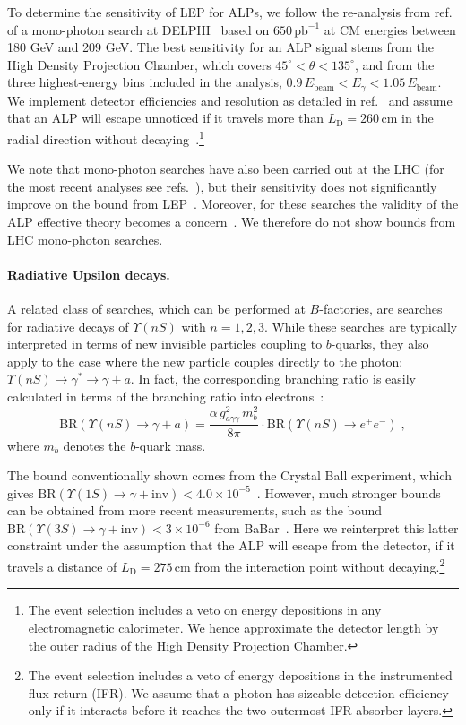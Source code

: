 \documentclass[11pt,a4paper]{article}
\newcommand{\ga}{g_{a\gamma\gamma}}
\def \babar {BaBar\xspace}
\begin{document}
To determine the sensitivity of LEP for ALPs, we follow the re-analysis from ref.~\cite{Fox:2011fx} of a mono-photon search at DELPHI~\cite{Abdallah:2008aa} based on $650\,\mathrm{pb^{-1}}$ at CM energies between 180 GeV and 209 GeV. The best sensitivity for an ALP signal stems from the High Density Projection Chamber, which covers $45^\circ < \theta < 135^\circ$, and from the three highest-energy bins included in the analysis, $0.9 \, E_\text{beam} < E_\gamma < 1.05 \, E_\text{beam}$. We implement detector efficiencies and resolution as detailed in ref.~\cite{Fox:2011fx} and assume that an ALP will escape unnoticed if it travels more than $L_\mathrm{D} = 260\,\mathrm{cm}$ in the radial direction without decaying~\cite{Aarnio:1990vx}.\footnote{The event selection includes a veto on energy depositions in any electromagnetic calorimeter. We hence approximate the detector length by the outer radius of the High Density Projection Chamber.}

We note that mono-photon searches have also been carried out at the LHC (for the most recent analyses see refs.~\cite{Aaboud:2017dor,CMS:2017ysu}), but their sensitivity does not significantly improve on the bound from LEP~\cite{Mimasu:2014nea}. Moreover, for these searches the validity of the ALP effective theory becomes a concern~\cite{Mimasu:2014nea,Brivio:2017ije}. We therefore do not show bounds from LHC mono-photon searches.

\paragraph{Radiative Upsilon decays.}
A related class of searches, which can be performed at $B$-factories, are searches for radiative decays of $\Upsilon(nS)$ with $n = 1,2,3$. While these searches are typically interpreted in terms of new invisible particles coupling to $b$-quarks, they also apply to the case where the new particle couples directly to the photon: $\Upsilon(nS) \to \gamma^\ast \to \gamma + a$. In fact, the corresponding branching ratio is easily calculated in terms of the branching ratio into electrons~\cite{Masso:1995tw}:
\begin{equation}
 \text{BR}(\Upsilon(nS) \to \gamma + a) = \frac{\alpha \, \ga^2 \, m_b^2}{8\pi} \cdot \text{BR}(\Upsilon(nS) \to e^+ e^-) \; ,
\end{equation}
where $m_b$ denotes the $b$-quark mass.

The bound conventionally shown comes from the Crystal Ball experiment, which gives $\text{BR}(\Upsilon(1S) \to \gamma + \text{inv}) < 4.0 \times 10^{-5}$~\cite{Antreasyan:1990cf}. However, much stronger bounds can be obtained from more recent measurements, such as the bound $\text{BR}(\Upsilon(3S) \to \gamma + \text{inv}) < 3 \times 10^{-6}$ from \babar~\cite{Aubert:2008as}. Here we reinterpret this latter constraint under the assumption that the ALP will escape from the detector, if it travels a distance of $L_\mathrm{D}=275$\,cm from the interaction point without decaying.\footnote{The event selection includes a veto of energy depositions in the instrumented flux return (IFR). We assume that a photon has sizeable detection efficiency only if it interacts before it reaches the two outermost IFR absorber layers.}
\end{document}
